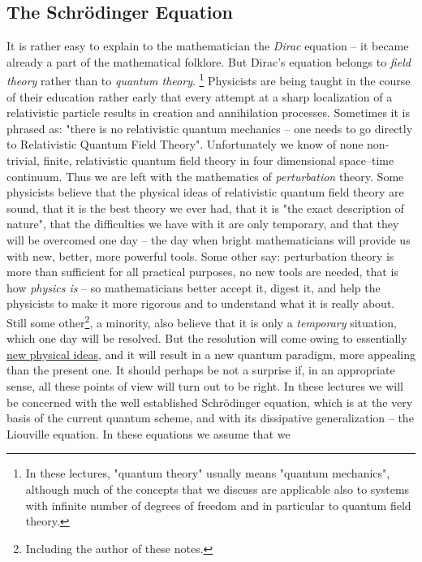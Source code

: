 \documentclass[12pt]{article}
\begin{document}
\subsection{The Schr\"odinger Equation}

It is rather easy to explain to the mathematician the {\sl Dirac} equation --
it became already a part of the mathematical folklore.  But Dirac's equation
belongs to {\sl field theory} rather than to
{\sl quantum theory}. \footnote{In
these lectures,  "quantum theory" usually means
"quantum mechanics",  although much of the concepts that we discuss
are applicable also to systems with infinite number of degrees of
freedom and in particular to quantum field theory. } Physicists are being
taught in the course of their education rather early that every attempt at a
sharp localization of a relativistic particle results in creation and
annihilation processes.  Sometimes it is phrased as:  "there is no relativistic
quantum mechanics -- one needs to go directly to Relativistic Quantum Field
Theory".  Unfortunately we know of none non-trivial,  finite,  
relativistic quantum
field theory in four dimensional space--time continuum.  Thus we are left
with the mathematics of {\sl perturbation} theory.  Some physicists believe
that the physical ideas of relativistic quantum field theory are sound,  that
it is the best theory we ever had,  that it is "the exact description of 
nature",  that
the difficulties we have with it are only temporary,  and that they will be 
overcomed one day --
the day when bright mathematicians will provide us with new,  better,  more
powerful tools.  Some other say:  perturbation theory is more than sufficient
for all practical purposes,  no new tools are needed,  that is how {\sl physics
is} -- so mathematicians better accept it,  digest it,  and help the physicists
to make it more rigorous and to understand what it is really about.  Still some
other\footnote{Including the  author of these notes. },  a
minority,  also believe that it is only a {\sl temporary} situation,  which
one day will be resolved.  But the resolution will come
owing to essentially
\underline{new physical ideas}, 
and it will result in a new quantum paradigm,  more appealing than the
present one.  It should perhaps be not a surprise if,  in an appropriate sense,  
all
these points of view will turn out to be right.  In these lectures we will be
concerned with the well established Schr\"odinger equation,  which is at the
very basis of the current quantum scheme,  and with its dissipative
generalization -- the Liouville equation. 
In these equations we assume that we 
\end{document}
